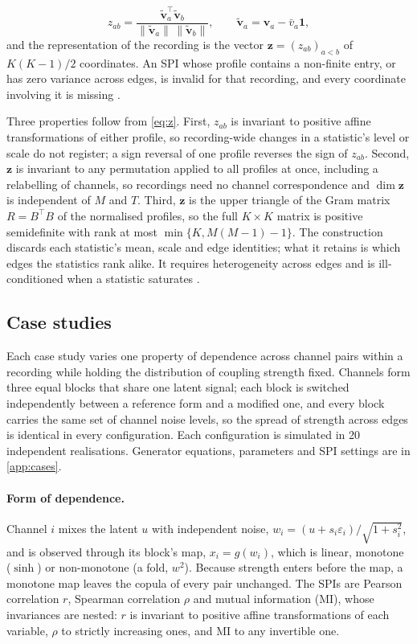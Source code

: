 \begin{equation}
	z_{ab} = \frac{\tilde{\mathbf{v}}_a^{\top}\tilde{\mathbf{v}}_b}{\lVert\tilde{\mathbf{v}}_a\rVert\,\lVert\tilde{\mathbf{v}}_b\rVert}, \qquad \tilde{\mathbf{v}}_a = \mathbf{v}_a - \bar{v}_a\mathbf{1},
	\label{eq:z}
\end{equation}
and the representation of the recording is the vector $\mathbf{z} = (z_{ab})_{a<b}$ of $K(K-1)/2$ coordinates. An SPI whose profile contains a non-finite entry, or has zero variance across edges, is invalid for that recording, and every coordinate involving it is missing .

Three properties follow from \cref{eq:z}. First, $z_{ab}$ is invariant to positive affine transformations of either profile, so recording-wide changes in a statistic's level or scale do not register; a sign reversal of one profile reverses the sign of $z_{ab}$. Second, $\mathbf{z}$ is invariant to any permutation applied to all profiles at once, including a relabelling of channels, so recordings need no channel correspondence and $\dim\mathbf{z}$ is independent of $M$ and $T$. Third, $\mathbf{z}$ is the upper triangle of the Gram matrix $R = B^{\top}B$ of the normalised profiles, so the full $K \times K$ matrix is positive semidefinite with rank at most $\min\{K, M(M-1)-1\}$. The construction discards each statistic's mean, scale and edge identities; what it retains is which edges the statistics rank alike. It requires heterogeneity across edges and is ill-conditioned when a statistic saturates .

\subsection{Case studies}
\label{sec:methods-cases}
Each case study varies one property of dependence across channel pairs within a recording while holding the distribution of coupling strength fixed. Channels form three equal blocks that share one latent signal; each block is switched independently between a reference form and a modified one, and every block carries the same set of channel noise levels, so the spread of strength across edges is identical in every configuration. Each configuration is simulated in 20 independent realisations. Generator equations, parameters and SPI settings are in \cref{app:cases}.

\paragraph{Form of dependence.} Channel $i$ mixes the latent $u$ with independent noise, $w_i = (u + s_i \varepsilon_i)/\sqrt{1+s_i^2}$, and is observed through its block's map, $x_i = g(w_i)$, which is linear, monotone ($\sinh$) or non-monotone (a fold, $w^2$). Because strength enters before the map, a monotone map leaves the copula of every pair unchanged. The SPIs are Pearson correlation $r$, Spearman correlation $\rho$ and mutual information (MI), whose invariances are nested: $r$ is invariant to positive affine transformations of each variable, $\rho$ to strictly increasing ones, and MI to any invertible one.

